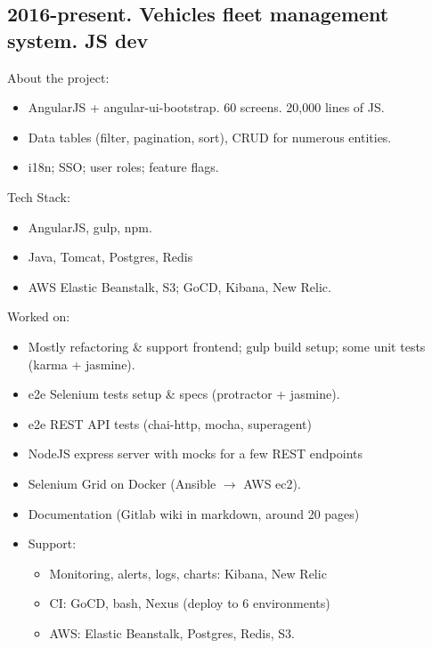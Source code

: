 \documentclass[a4paper, 14pt]{article}
\begin{document}
	\subsection{2016-present. Vehicles fleet management system. JS dev}
    About the project:
    \begin{itemize}
      \item AngularJS + angular-ui-bootstrap. 60 screens. 20,000 lines of JS. \\
      \item Data tables (filter, pagination, sort), CRUD for numerous entities. \\
      \item i18n; SSO; user roles; feature flags. \\
    \end{itemize}
    Tech Stack:
    \begin{itemize}
      \item AngularJS, gulp, npm. \\
      \item Java, Tomcat, Postgres, Redis \\
      \item AWS Elastic Beanstalk, S3; GoCD, Kibana, New Relic. \\
    \end{itemize}
    Worked on: 
    \begin{itemize}
      \item Mostly refactoring \& support frontend; gulp build setup; some unit tests (karma + jasmine). \\
      \item e2e Selenium tests setup \& specs (protractor + jasmine). \\
      \item e2e REST API tests (chai-http, mocha, superagent) \\
      \item NodeJS express server with mocks for a few REST endpoints \\
      \item Selenium Grid on Docker (Ansible $\rightarrow$ AWS ec2). \\
      \item Documentation (Gitlab wiki in markdown, around 20 pages) \\
      \item Support:
        \begin{itemize}
          \item Monitoring, alerts, logs, charts: Kibana, New Relic \\
          \item CI: GoCD, bash, Nexus (deploy to 6 environments) \\
          \item AWS: Elastic Beanstalk, Postgres, Redis, S3. \\
        \end{itemize}
      \end{itemize}
\end{document}
